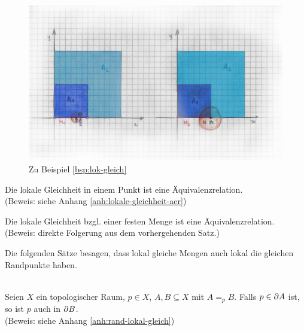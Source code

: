     \begin{figure}[ht]
        \centering
        \includegraphics[width=\textwidth]{abb/lok-gleich.png}
        \caption{Zu Beispiel \ref{bsp:lok-gleich}}
        \label{fig:lok-gleich}
    \end{figure}

        
%     
    
    \begin{satz}\label{satz:lokale-gleichheit-aer}
        Die lokale Gleichheit in einem Punkt ist eine Äquivalenzrelation.\\
        (Beweis: siehe Anhang \ref{anh:lokale-gleichheit-aer})
    \end{satz}
    
    \begin{kor}\label{kor:lokale-gleichheit-aer}
     Die lokale Gleichheit bzgl. einer festen Menge ist eine Äquivalenzrelation.\\
     (Beweis: direkte Folgerung aus dem vorhergehenden Satz.)
    \end{kor}
    
    Die folgenden Sätze besagen, dass lokal gleiche Mengen auch lokal die gleichen Randpunkte haben.
    \begin{satz}\label{satz:rand-lokal-gleich}\ \\
        Seien $X$ ein topologischer Raum, $p \in X$, $A,B \subseteq X$ mit $A =_p B$. Falls $p \in \partial A$ ist, so ist $p$ auch in $\partial B$.\\
        (Beweis: siehe Anhang \ref{anh:rand-lokal-gleich})
    \end{satz}
    
